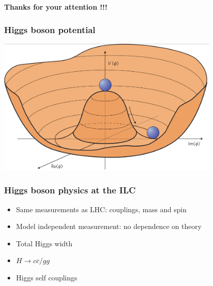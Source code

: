 \documentclass{beamer}
\begin{document}
\begin{frame}
  \begin{center}
    \huge
    \textbf{Thanks for your attention !!!}
  \end{center}
\end{frame}

  \appendix
  \setcounter{lastframe}{\insertframenumber}

  \begin{frame}[plain]
    \frametitle{Higgs boson potential}

    \begin{center}
      \includegraphics[width = 0.8\textwidth]{Pictures/higgsPotential.png}
    \end{center}
  \end{frame}

  \begin{frame}[plain]
    \frametitle{Higgs boson physics at the ILC}

    \begin{itemize}
      \item Same measurements as LHC: couplings, mass and spin
      \item Model independent measurement: no dependence on theory
      \item Total Higgs width
      \item $H \rightarrow c\overline{c}/gg$
      \item Higgs self couplings
    \end{itemize}
  \end{frame}
\end{document}
